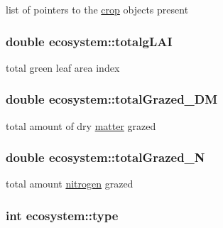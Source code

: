 list of pointers to the \hyperlink{classcrop}{crop} objects present \hypertarget{classecosystem_adafee4145128b86c471661c5ad889054}{
\subsubsection[{totalgLAI}]{\setlength{\rightskip}{0pt plus 5cm}double {\bf ecosystem::totalgLAI}}}
\label{classecosystem_adafee4145128b86c471661c5ad889054}


total green leaf area index \hypertarget{classecosystem_a4aeb89d26c705346cfdb14914d0b0aaa}{
\subsubsection[{totalGrazed\_\-DM}]{\setlength{\rightskip}{0pt plus 5cm}double {\bf ecosystem::totalGrazed\_\-DM}}}
\label{classecosystem_a4aeb89d26c705346cfdb14914d0b0aaa}


total amount of dry \hyperlink{classmatter}{matter} grazed \hypertarget{classecosystem_a77bd4dfe78513840eb8c15a0206880a5}{
\subsubsection[{totalGrazed\_\-N}]{\setlength{\rightskip}{0pt plus 5cm}double {\bf ecosystem::totalGrazed\_\-N}}}
\label{classecosystem_a77bd4dfe78513840eb8c15a0206880a5}


total amount \hyperlink{classnitrogen}{nitrogen} grazed \hypertarget{classecosystem_a33c5d59a1b021f453ffad961f46cd0b7}{
\subsubsection[{type}]{\setlength{\rightskip}{0pt plus 5cm}int {\bf ecosystem::type}}}
\label{classecosystem_a33c5d59a1b021f453ffad961f46cd0b7}


